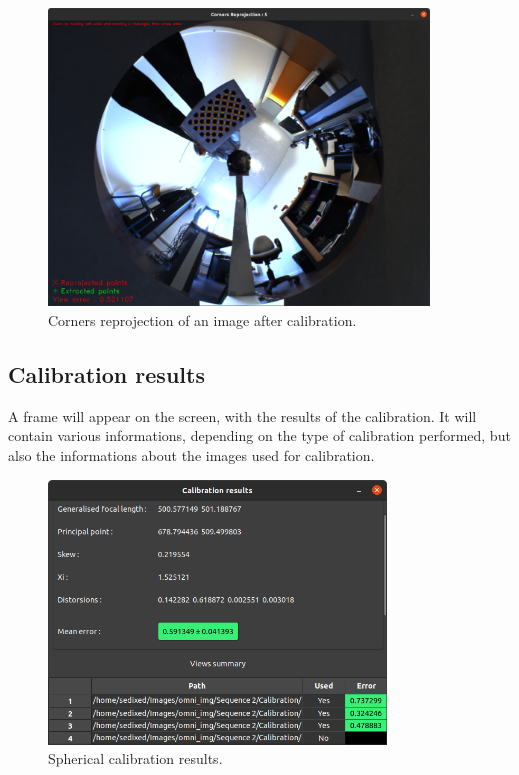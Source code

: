\documentclass{article}
\begin{document}
\begin{figure}[H]
\centering
\includegraphics[width=0.9\textwidth]{sr.png}
\caption{\label{fig:sr}Corners reprojection of an image after calibration.}
\end{figure}

\subsection{Calibration results}

A frame will appear on the screen, with the results of the calibration. It will contain various informations, depending on the type of calibration performed, but also the informations about the images used for calibration.

\begin{figure}[H]
\centering
\includegraphics[width=0.8\textwidth]{results.png}
\caption{\label{fig:results}Spherical calibration results.}
\end{figure}
\end{document}

